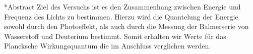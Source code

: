 \documentclass[pdftex, a4paper,11pt, twoside, ngerman]{report}
\begin{document}
  
  
  
  
  
  
  
  
  \begin{chapter}*{Abstract}
    Ziel des Versuchs ist es den Zusammenhang zwischen Energie und Frequenz des
    Lichts zu bestimmen. Hierzu wird die Quantelung der Energie sowohl durch
    den Photoeffekt, als auch durch die Messung der Balmerserie von
    Wasserstoff und Deuterium bestimmt. Somit erhalten wir Werte für das
    Plancksche Wirkungsquantum die im Anschluss verglichen werden.
  \end{chapter}
  
  \tableofcontents
  
  
  
\end{document}
